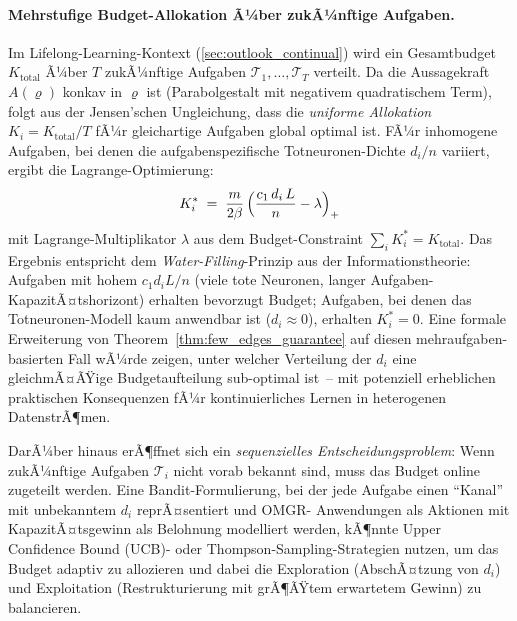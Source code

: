﻿\documentclass[12pt, a4paper, openany]{report}
\begin{document}
\paragraph{Mehrstufige Budget-Allokation Ã¼ber zukÃ¼nftige Aufgaben.}
Im Lifelong-Learning-Kontext (\cref{sec:outlook_continual}) wird ein
Gesamtbudget $K_{\mathrm{total}}$ Ã¼ber $T$ zukÃ¼nftige Aufgaben
$\mathcal{T}_1, \ldots, \mathcal{T}_T$ verteilt.  Da die Aussagekraft
$A(\varrho)$ konkav in $\varrho$ ist (Parabolgestalt mit negativem
quadratischem Term), folgt aus der Jensen'schen Ungleichung, dass die
\emph{uniforme Allokation} $K_i = K_{\mathrm{total}}/T$ fÃ¼r gleichartige
Aufgaben global optimal ist.  FÃ¼r inhomogene Aufgaben, bei denen die
aufgabenspezifische Totneuronen-Dichte $d_i/n$ variiert, ergibt die
Lagrange-Optimierung:
\[
  K_i^*
  \;=\; \frac{m}{2\beta}\,\Bigl(\frac{c_{1}\,d_i\,L}{n} - \lambda\Bigr)_+
\]
mit Lagrange-Multiplikator $\lambda$ aus dem Budget-Constraint
$\sum_i K_i^* = K_{\mathrm{total}}$.  Das Ergebnis entspricht dem
\emph{Water-Filling}-Prinzip aus der Informationstheorie: Aufgaben mit
hohem $c_1 d_i L / n$ (viele tote Neuronen, langer Aufgaben-KapazitÃ¤tshorizont)
erhalten bevorzugt Budget; Aufgaben, bei denen das Totneuronen-Modell kaum
anwendbar ist ($d_i \approx 0$), erhalten $K_i^* = 0$.  Eine formale
Erweiterung von Theorem~\ref{thm:few_edges_guarantee} auf diesen
mehraufgaben-basierten Fall wÃ¼rde zeigen, unter welcher Verteilung der $d_i$
eine gleichmÃ¤ÃŸige Budgetaufteilung sub-optimal ist~-- mit potenziell
erheblichen praktischen Konsequenzen fÃ¼r kontinuierliches Lernen in
heterogenen DatenstrÃ¶men.

DarÃ¼ber hinaus erÃ¶ffnet sich ein \emph{sequenzielles Entscheidungsproblem}:
Wenn zukÃ¼nftige Aufgaben $\mathcal{T}_i$ nicht vorab bekannt sind, muss
das Budget online zugeteilt werden.  Eine Bandit-Formulierung, bei der jede
Aufgabe einen ``Kanal'' mit unbekanntem $d_i$ reprÃ¤sentiert und OMGR-
Anwendungen als Aktionen mit KapazitÃ¤tsgewinn als Belohnung modelliert
werden, kÃ¶nnte Upper Confidence Bound (UCB)- oder Thompson-Sampling-Strategien
nutzen, um das Budget adaptiv zu allozieren und dabei die Exploration
(AbschÃ¤tzung von $d_i$) und Exploitation (Restrukturierung mit grÃ¶ÃŸtem
erwartetem Gewinn) zu balancieren.
\end{document}
